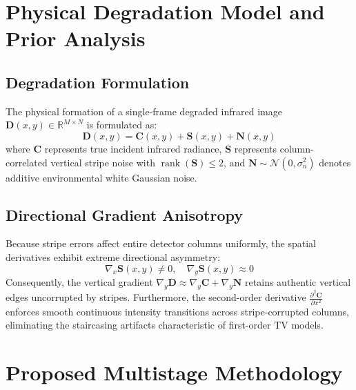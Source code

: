 \documentclass[lettersize,journal]{IEEEtran}
\begin{document}
\section{Physical Degradation Model and Prior Analysis}
\subsection{Degradation Formulation}
The physical formation of a single-frame degraded infrared image $\mathbf{D}(x, y) \in \mathbb{R}^{M \times N}$ is formulated as:
\begin{equation}
    \mathbf{D}(x, y) = \mathbf{C}(x, y) + \mathbf{S}(x, y) + \mathbf{N}(x, y)
    \label{eq:degradation_model}
\end{equation}
where $\mathbf{C}$ represents true incident infrared radiance, $\mathbf{S}$ represents column-correlated vertical stripe noise with $\operatorname{rank}(\mathbf{S}) \le 2$, and $\mathbf{N} \sim \mathcal{N}(0, \sigma_n^2)$ denotes additive environmental white Gaussian noise.

\subsection{Directional Gradient Anisotropy}
Because stripe errors affect entire detector columns uniformly, the spatial derivatives exhibit extreme directional asymmetry:
\begin{equation}
    \nabla_x \mathbf{S}(x, y) \ne 0, \quad \nabla_y \mathbf{S}(x, y) \approx 0
\end{equation}
Consequently, the vertical gradient $\nabla_y \mathbf{D} \approx \nabla_y \mathbf{C} + \nabla_y \mathbf{N}$ retains authentic vertical edges uncorrupted by stripes. Furthermore, the second-order derivative $\frac{\partial^2 \mathbf{C}}{\partial x^2}$ enforces smooth continuous intensity transitions across stripe-corrupted columns, eliminating the staircasing artifacts characteristic of first-order TV models.

\section{Proposed Multistage Methodology}
\end{document}
